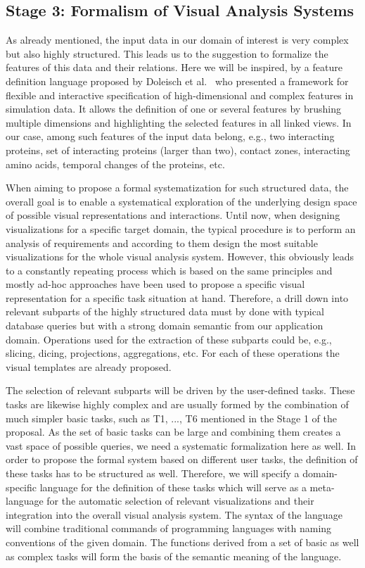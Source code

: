 \documentclass[11pt,a4paper,titlepage,oneside,onecolumn]{article}
\begin{document}
\subsection{Stage 3: Formalism of Visual Analysis Systems}
As already mentioned, the input data in our domain of interest is very complex but also highly structured.
This leads us to the suggestion to formalize the features of this data and their relations.
Here we will be inspired, by a feature definition language proposed by Doleisch et al.~\cite{Doleisch} who presented a framework for flexible and interactive specification of high-dimensional and complex features in simulation data.
It allows the definition of one or several features by brushing multiple dimensions and highlighting the selected features in all linked views.
In our case, among such features of the input data belong, e.g., two interacting proteins, set of interacting proteins (larger than two), contact zones, interacting amino acids, temporal changes of the proteins, etc. 

When aiming to propose a formal systematization for such structured data, the overall goal is to enable a systematical exploration of the underlying design space of possible visual representations and interactions.
Until now, when designing visualizations for a specific target domain, the typical procedure is to perform an analysis of requirements and according to them design the most suitable visualizations for the whole visual analysis system. 
However, this obviously leads to a constantly repeating process which is based on the same principles and mostly ad-hoc approaches have been used to propose a specific visual representation for a specific task situation at hand.
Therefore, a drill down into relevant subparts of the highly structured data must by done with typical database queries but with a strong domain semantic from our application domain. 
Operations used for the extraction of these subparts could be, e.g., slicing, dicing, projections, aggregations, etc. 
For each of these operations the visual templates are already proposed.

The selection of relevant subparts will be driven by the user-defined tasks.
These tasks are likewise highly complex and are usually formed by the combination of much simpler basic tasks, such as T1, ..., T6 mentioned in the Stage 1 of the proposal. 
As the set of basic tasks can be large and combining them creates a vast space of possible queries, we need a systematic formalization here as well.
In order to propose the formal system based on different user tasks, the definition of these tasks has to be structured as well. 
Therefore, we will specify a domain-specific language for the definition of these tasks which will serve as a meta-language for the automatic selection of relevant visualizations and their integration into the overall visual analysis system.
The syntax of the language will combine traditional commands of programming languages with naming conventions of the given domain.
The functions derived from a set of basic as well as complex tasks will form the basis of the semantic meaning of the language.
\end{document}
